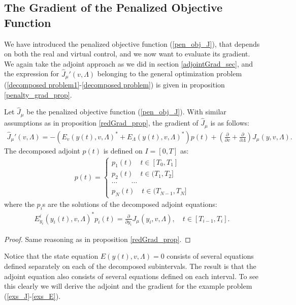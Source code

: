 \subsection{The Gradient of the Penalized Objective Function}
We have introduced the penalized objective function (\ref{pen_obj_J}), that depends on both the real and virtual control, and we now want to evaluate its gradient. We again take the adjoint approach as we did in section \ref{adjointGrad_sec}, and the expression for $\hat J_{\mu}'(v,\Lambda)$ belonging to the general optimization problem (\ref{decomposed problem1}-\ref{decomposed problem}) is given in proposition \ref{penalty_grad_prop}.
\begin{proposition} \label{penalty_grad_prop}
Let $\hat J_{\mu}$ be the penalized objective function (\ref{pen_obj_J}). With similar assumptions as in proposition \ref{redGrad_prop}, the gradient of $\hat J_{\mu}$ is as follows: 
\begin{align}
\hat J_{\mu}'(v,\Lambda)=-(E_v(y(t),v,\Lambda)^*+E_{\Lambda}(y(t),v,\Lambda)^*)p(t)+ (\frac{\partial}{\partial v}+\frac{\partial}{\partial\Lambda})J_{\mu}(y,v,\Lambda). \label{pen_abs_grad}
\end{align}
The decomposed adjoint $p(t)$ is defined on $I=[0,T]$ as:
\begin{align}
 p(t)=\left\{
     \begin{array}{lr}
		p_1(t)\quad t\in [T_0,T_1] \\
		p_2(t)\quad t\in(T_1,T_2] \\
		\cdots \quad\quad\cdots\\
		p_N(t)\quad t\in(T_{N-1},T_N]
	\end{array}
   \right.	\label{GatherAdjoint}
\end{align}
where the $p_i$s are the solutions of the decomposed adjoint equations:
\begin{align}
E_{y_i}^i(y_i(t),v,\Lambda)^{*}p_i(t)=\frac{\partial}{\partial y_i}J_{\mu}(y_i,v,\Lambda), \quad t\in [T_{i-1},T_i]. \label{penalty adjoint}
\end{align}
\end{proposition}
\begin{proof}
Same reasoning as in proposition \ref{redGrad_prop}.
\end{proof}
\noindent
Notice that the state equation $E(y(t),v,\Lambda)=0$ consists of several equations defined separately on each of the decomposed subintervals. The result is that the adjoint equation also consists of several equations defined on each interval. To see this clearly we will derive the adjoint and the gradient for the example problem (\ref{exs_J}-\ref{exs_E}).
